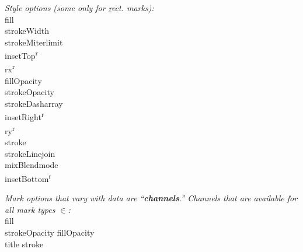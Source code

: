 \textit{Style options (some only for \ul{r}ect. marks):}\\
\api
{\widththree}{fill \\ strokeWidth \\ strokeMiterlimit \\ insetTop\textsuperscript{r} \\ rx\textsuperscript{r} \\}
{\widththree}{fillOpacity \\ strokeOpacity \\ strokeDasharray \\ insetRight\textsuperscript{r} \\ ry\textsuperscript{r} \\}
{\widththree}{stroke \\ strokeLinejoin \\ mixBlendmode \\ insetBottom\textsuperscript{r} \\}
\stopapi

\textit{Mark options that vary with data are ``{\rm\bf channels}.'' Channels that are available for all mark types $\in$:}\\
\api
{\widththree}{fill \\ strokeOpacity}
{\widththree}{fillOpacity \\ title}
{\widththree}{stroke}
\stopapi
\vspace{1mm}

